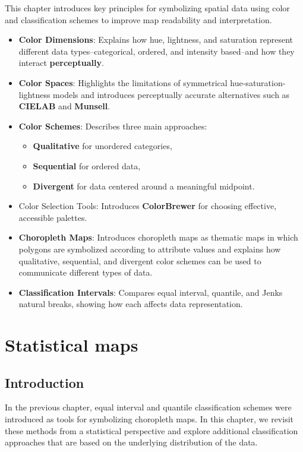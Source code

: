 \documentclass[
  letterpaper,
]{book}
\providecommand{\tightlist}{%
  \setlength{\itemsep}{0pt}\setlength{\parskip}{0pt}}
\begin{document}
This chapter introduces key principles for symbolizing spatial data
using color and classification schemes to improve map readability and
interpretation.

\begin{itemize}
\tightlist
\item
  \textbf{Color Dimensions}: Explains how hue, lightness, and saturation
  represent different data types--categorical, ordered, and intensity
  based--and how they interact \textbf{perceptually}.
\item
  \textbf{Color Spaces}: Highlights the limitations of symmetrical
  hue-saturation-lightness models and introduces perceptually accurate
  alternatives such as \textbf{CIELAB} and \textbf{Munsell}.
\item
  \textbf{Color Schemes}: Describes three main approaches:

  \begin{itemize}
  \tightlist
  \item
    \textbf{Qualitative} for unordered categories,
  \item
    \textbf{Sequential} for ordered data,
  \item
    \textbf{Divergent} for data centered around a meaningful midpoint.
  \end{itemize}
\item
  Color Selection Tools: Introduces \textbf{ColorBrewer} for choosing
  effective, accessible palettes.
\item
  \textbf{Choropleth Maps}: Introduces choropleth maps as thematic maps
  in which polygons are symbolized according to attribute values and
  explains how qualitative, sequential, and divergent color schemes can
  be used to communicate different types of data.
\item
  \textbf{Classification Intervals}: Compares equal interval, quantile,
  and Jenks natural breaks, showing how each affects data
  representation.
\end{itemize}

\chapter{Statistical maps}\label{statistical-maps}

\section{Introduction}\label{introduction-4}

In the previous chapter, equal interval and quantile classification
schemes were introduced as tools for symbolizing choropleth maps. In
this chapter, we revisit these methods from a statistical perspective
and explore additional classification approaches that are based on the
underlying distribution of the data.
\end{document}
